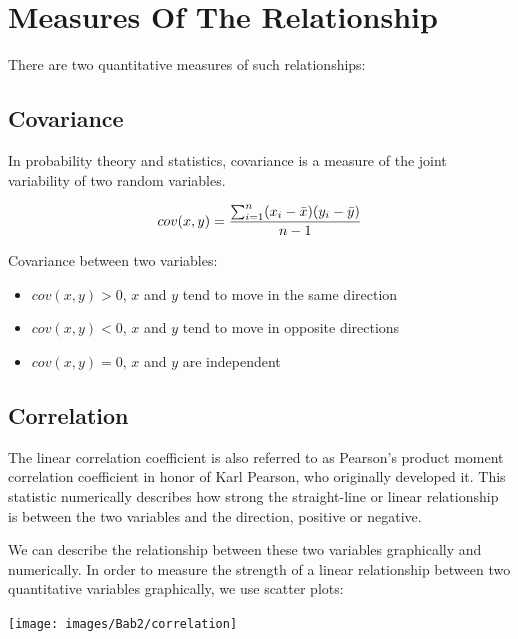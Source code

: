 \documentclass[
]{book}
\providecommand{\tightlist}{%
  \setlength{\itemsep}{0pt}\setlength{\parskip}{0pt}}
\begin{document}
\hypertarget{measures-of-the-relationship}{%
\section{Measures Of The Relationship}\label{measures-of-the-relationship}}

There are two quantitative measures of such relationships:

\hypertarget{covariance}{%
\subsection{Covariance}\label{covariance}}

In probability theory and statistics, covariance is a measure of the joint variability of two random variables.

\[
\begin{aligned}
cov(x,y)={\sum^n_{i=1} (x_i-\bar{x})(y_i-\bar{y}) \over n-1} \\
\end{aligned}
\]

Covariance between two variables:

\begin{itemize}
\tightlist
\item
  \(cov(x,y) > 0\), \(x\) and \(y\) tend to move in the same direction
\item
  \(cov(x,y) < 0\), \(x\) and \(y\) tend to move in opposite directions
\item
  \(cov(x,y) = 0\), \(x\) and \(y\) are independent
\end{itemize}

\hypertarget{correlation}{%
\subsection{Correlation}\label{correlation}}

The linear correlation coefficient is also referred to as Pearson's product moment correlation coefficient in honor of Karl Pearson, who originally developed it. This statistic numerically describes how strong the straight-line or linear relationship is between the two variables and the direction, positive or negative.

We can describe the relationship between these two variables graphically and numerically. In order to measure the strength of a linear relationship between two quantitative variables graphically, we use scatter plots:

\begin{center}\texttt{[image: images/Bab2/correlation]} \end{center}
\end{document}

